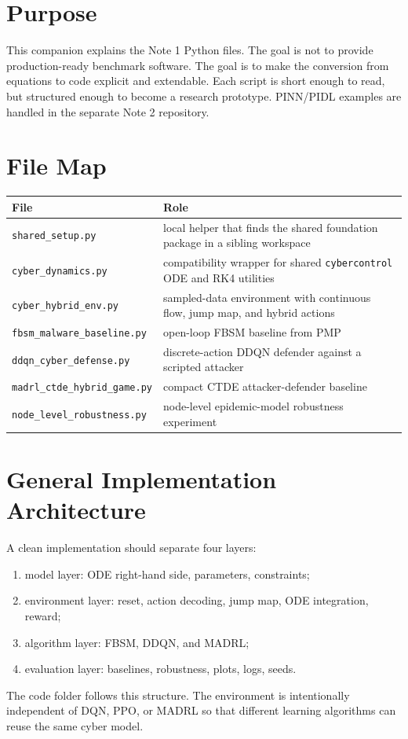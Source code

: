 \documentclass[11pt,a4paper]{article}
\begin{document}
\tableofcontents
\newpage

\section{Purpose}
This companion explains the Note 1 Python files. The goal is not to provide production-ready benchmark software. The goal is to make the conversion from equations to code explicit and extendable. Each script is short enough to read, but structured enough to become a research prototype. PINN/PIDL examples are handled in the separate Note 2 repository.

\section{File Map}
\begin{longtable}{p{}p{}}
\toprule
File & Role \\
\midrule
\small\texttt{shared\_setup.py} & local helper that finds the shared foundation package in a sibling workspace \\
\small\texttt{cyber\_dynamics.py} & compatibility wrapper for shared \texttt{cybercontrol} ODE and RK4 utilities \\
\small\texttt{cyber\_hybrid\_env.py} & sampled-data environment with continuous flow, jump map, and hybrid actions \\
\small\texttt{fbsm\_malware\_baseline.py} & open-loop FBSM baseline from PMP \\
\small\texttt{ddqn\_cyber\_defense.py} & discrete-action DDQN defender against a scripted attacker \\
\small\texttt{madrl\_ctde}\newline\small\texttt{\_hybrid\_game.py} & compact CTDE attacker-defender baseline \\
\small\texttt{node\_level\_robustness.py} & node-level epidemic-model robustness experiment \\
\bottomrule
\end{longtable}

\section{General Implementation Architecture}
A clean implementation should separate four layers:
\begin{enumerate}
\item model layer: ODE right-hand side, parameters, constraints;
\item environment layer: reset, action decoding, jump map, ODE integration, reward;
\item algorithm layer: FBSM, DDQN, and MADRL;
\item evaluation layer: baselines, robustness, plots, logs, seeds.
\end{enumerate}
The code folder follows this structure. The environment is intentionally independent of DQN, PPO, or MADRL so that different learning algorithms can reuse the same cyber model.
\end{document}
